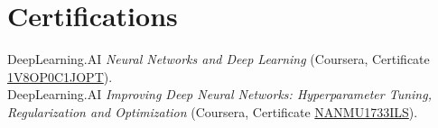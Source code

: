 \documentclass[11pt]{article}
\begin{document}
\section*{Certifications}
DeepLearning.AI \emph{Neural Networks and Deep Learning} (Coursera, Certificate \href{https://coursera.org/verify/1V8OP0C1JOPT}{1V8OP0C1JOPT}).\\
DeepLearning.AI \emph{Improving Deep Neural Networks: Hyperparameter Tuning, Regularization and Optimization} (Coursera, Certificate \href{https://coursera.org/verify/NANMU1733ILS}{NANMU1733ILS}).
\end{document}
